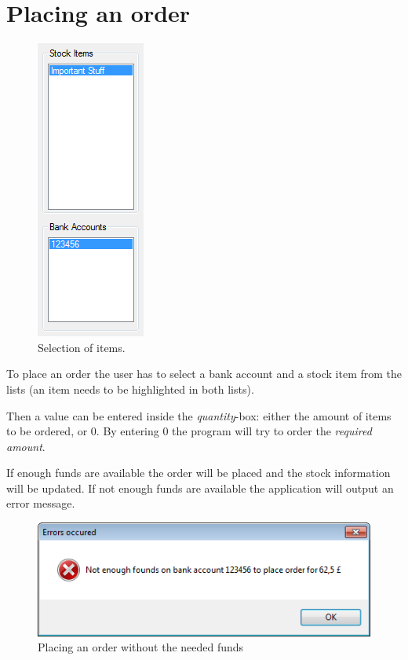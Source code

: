 \section{Placing an order}
\label{sec:placing_order}

\begin{figure} %
\centering
\includegraphics[scale=0.6]{gfx/highlighted_items.png}
\caption{Selection of items.}
\label{fig:highlighted_items}
\end{figure}

To place an order the user has to select a bank account and a stock item from the lists (an item needs to be highlighted in both lists).

Then a value can be entered inside the \textit{quantity}-box: either the amount of items to be ordered, or 0. By entering 0 the program will try to order the \textit{required amount}.

If enough funds are available the order will be placed and the stock information will be updated.
If not enough funds are available the application will output an error message.

\begin{figure}[H]
\begin{center}
\includegraphics[scale=0.8]{gfx/not_enough_funds.png}
\caption{Placing an order without the needed funds}
\label{fig:not_enough_funds}
\end{center}
\end{figure}

